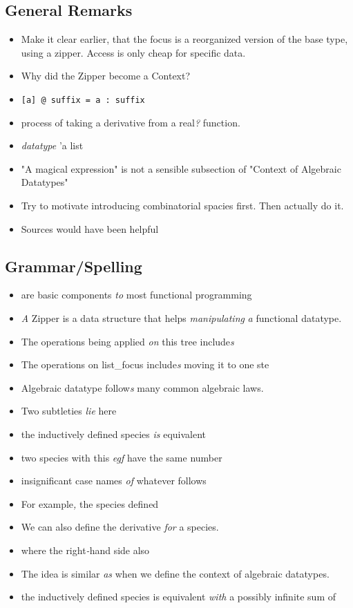 \documentclass{article}
\begin{document}
\subsection{General Remarks}
\begin{itemize}
    \item Make it clear earlier, that the focus is a reorganized version of the base type, using a zipper. Access is only cheap for specific data.
    \item Why did the Zipper become a Context?
    \item \texttt{[a] @ suffix = a : suffix}
    \item process of taking a derivative from a real\emph{?} function.
    \item \emph{datatype} 'a list
    \item "A magical expression" is not a sensible subsection of "Context of Algebraic Datatypes"
    \item Try to motivate introducing combinatorial spacies first. Then actually do it.
    \item Sources would have been helpful    
\end{itemize}

\subsection{Grammar/Spelling}
\begin{itemize}
    \item are basic components \emph{to} most functional programming
    \item \emph{A} Zipper is a data structure that helps \emph{manipulating} \emph{a} functional datatype.
    \item The operations being applied \emph{on} this tree include\emph{s}
    \item The operations on list\_focus include\emph{s} moving it to one ste
    \item Algebraic datatype follow\emph{s} many common algebraic laws.
    \item Two subtleties \emph{lie} here
    \item the inductively defined species \emph{is} equivalent
    \item two species with this \emph{egf} have the same number
    \item insignificant case names \emph{of} whatever follows
    \item For example\emph{,} the species defined
    \item We can also define the derivative \emph{for} a species.
    \item where the right\emph{-}hand side also
    \item The idea is similar \emph{as} when we define the context of algebraic datatypes.
    \item the inductively defined species is equivalent \emph{with} a possibly infinite sum of
\end{itemize}
\end{document}
